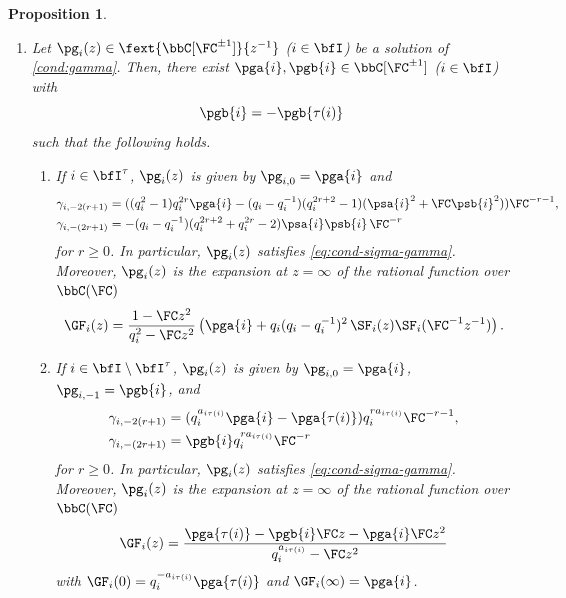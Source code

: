 \documentclass[reqno]{amsart}
\numberwithin{equation}{section}
\newtheorem*{proposition}{Proposition}
\begin{document}
\begin{proposition}
\begin{enumerate}[leftmargin=2em]
\item 
Let $\pg_i(z)\in\fext{\bbC[\FC^{\pm1}]}{z^{-1}}$ ($i\in\bfI$) be a solution of \eqref{cond:gamma}.
Then, there exist
$\pga{i}, \pgb{i}\in\bbC[\FC^{\pm1}]$ ($i\in\bfI$) with
\begin{equation}
\pgb{i}=-\pgb{\tau(i)}
\end{equation}
such that the following holds.\\
\begin{enumerate}[leftmargin=2em]\itemsep0.25cm 
\item If $i\in\bfI^\tau$, 
$\pg_i(z)$ is given by $\pg_{i,0}=\pga{i}$ and
\begin{equation}
\begin{aligned}
	\gamma_{i,-2(r+1)}&=(
(q_i^2-1)q_i^{2r}\pga{i}
-(q_i-q_i^{-1})(q_i^{2r+2}-1)(\psa{i}^2+\FC \psb{i}^2))\FC^{-r-1},\\
\gamma_{i,-(2r+1)}&=-(q_i-q_i^{-1})(q_i^{2r+2}+q_i^{2r}-2)\psa{i}\psb{i}\,\FC^{-r}
\end{aligned}
\end{equation}
for $r\geqslant 0$. In particular, $\pg_i(z)$ satisfies \eqref{eq:cond-sigma-gamma}.
Moreover, $\pg_i(z)$ is the expansion at $z=\infty$ of the rational function over $\bbC(\FC)$
\begin{equation}\label{eq:GF-fixed}
\GF_i(z)=\frac{1-\FC z^2}{q_i^2-\FC z^2}
\left(\pga{i}+q_i(q_i-q_i^{-1})^2\,\SF_i(z)\SF_i(\FC^{-1}z^{-1})\right).
\end{equation}
\item If $i\in\bfI\setminus\bfI^\tau$, $\pg_i(z)$ is given by $\pg_{i,0}=\pga{i}$,
$\pg_{i,-1}=\pgb{i}$, and
\begin{equation}
	\begin{aligned}
		\gamma_{i,-2(r+1)}&=(q_i^{a_{i\tau(i)}}\pga{i}-\pga{\tau(i)})q_i^{ra_{i\tau(i)}}\FC^{-r-1},\\
		\gamma_{i,-(2r+1)}&=\pgb{i}q_i^{ra_{i\tau(i)}}\FC^{-r}
	\end{aligned}
\end{equation}
for $r\geqslant 0$.
In particular, $\pg_i(z)$ satisfies \eqref{eq:cond-sigma-gamma}. Moreover, $\pg_i(z)$
is  the expansion at $z=\infty$ of the rational function over $\bbC(\FC)$
\begin{equation}\label{eq:GF-not-fixed}
\GF_i(z)=\frac{\pga{\tau(i)}-\pgb{i}\FC z-\pga{i}\FC z^2}{q_i^{a_{i\tau(i)}}-\FC z^2}
\end{equation}
with $\GF_i(0)=q_i^{-a_{i\tau(i)}}\pga{\tau(i)}$ and $\GF_i(\infty)=\pga{i}$.
\end{enumerate}

\end{enumerate}
\end{proposition}
\end{document}

